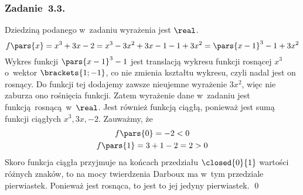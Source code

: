 \subsubsection*{Zadanie~3.3.}
Dziedziną podanego w~zadaniu wyrażenia jest \(\real\).
\begin{equation*}
    f\pars{x} = x^3 + 3x - 2
        = x^3 - 3x^2 + 3x - 1 - 1 + 3x^2
        = \pars{x - 1}^3 - 1 + 3x^2
\end{equation*}
Wykres funkcji \(\pars{x - 1}^3 - 1\) jest translacją wykresu funkcji rosnącej \(x^3\) o~wektor \(\brackets{1; -1}\), co nie zmienia kształtu wykresu, czyli nadal jest on rosnący. Do funkcji tej dodajemy zawsze nieujemne wyrażenie \(3x^2\), więc nie zaburza ono rośnięcia funkcji. Zatem wyrażenie dane w~zadaniu jest funkcją rosnącą w~\(\real\). Jest również funkcją ciągłą, ponieważ jest sumą funkcji ciągłych \(x^3, 3x, -2\). Zauważmy, że
\begin{gather*}
    f\pars{0} = -2 < 0\\
    f\pars{1} = 3 + 1 - 2 = 2 > 0
\end{gather*}
Skoro funkcja ciągła przyjmuje na końcach przedziału \(\closed{0}{1}\) wartości różnych znaków, to na mocy twierdzenia Darboux ma w~tym przedziale pierwiastek. Ponieważ jest rosnąca, to jest to jej jedyny pierwiastek.
\qed
